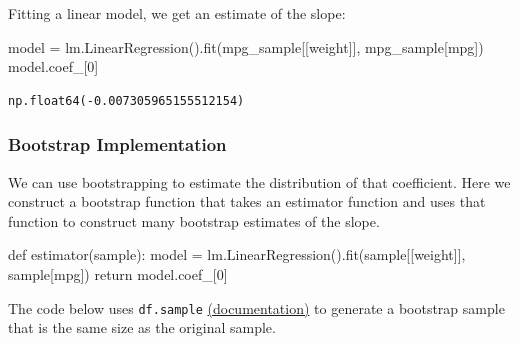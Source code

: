 \documentclass[
  letterpaper,
  DIV=11,
  numbers=noendperiod]{scrreprt}
\newenvironment{Shaded}{\begin{snugshade}}{\end{snugshade}}
\newcommand{\ControlFlowTok}[1]{\textcolor[rgb]{0.00,0.23,0.31}{#1}}
\newcommand{\DecValTok}[1]{\textcolor[rgb]{0.68,0.00,0.00}{#1}}
\newcommand{\KeywordTok}[1]{\textcolor[rgb]{0.00,0.23,0.31}{#1}}
\newcommand{\NormalTok}[1]{\textcolor[rgb]{0.00,0.23,0.31}{#1}}
\newcommand{\OperatorTok}[1]{\textcolor[rgb]{0.37,0.37,0.37}{#1}}
\newcommand{\StringTok}[1]{\textcolor[rgb]{0.13,0.47,0.30}{#1}}
\begin{document}
Fitting a linear model, we get an estimate of the slope:

\begin{Shaded}
\begin{Highlighting}[]
\NormalTok{model }\OperatorTok{=}\NormalTok{ lm.LinearRegression().fit(mpg\_sample[[}\StringTok{\textquotesingle{}weight\textquotesingle{}}\NormalTok{]], mpg\_sample[}\StringTok{\textquotesingle{}mpg\textquotesingle{}}\NormalTok{])}
\NormalTok{model.coef\_[}\DecValTok{0}\NormalTok{] }
\end{Highlighting}
\end{Shaded}

\begin{verbatim}
np.float64(-0.007305965155512154)
\end{verbatim}

\subsubsection{Bootstrap Implementation}\label{bootstrap-implementation}

We can use bootstrapping to estimate the distribution of that
coefficient. Here we construct a bootstrap function that takes an
estimator function and uses that function to construct many bootstrap
estimates of the slope.

\begin{Shaded}
\begin{Highlighting}[]
\KeywordTok{def}\NormalTok{ estimator(sample):}
\NormalTok{    model }\OperatorTok{=}\NormalTok{ lm.LinearRegression().fit(sample[[}\StringTok{\textquotesingle{}weight\textquotesingle{}}\NormalTok{]], sample[}\StringTok{\textquotesingle{}mpg\textquotesingle{}}\NormalTok{])}
    \ControlFlowTok{return}\NormalTok{ model.coef\_[}\DecValTok{0}\NormalTok{]}
\end{Highlighting}
\end{Shaded}

The code below uses \texttt{df.sample}
\href{https://pandas.pydata.org/pandas-docs/stable/reference/api/pandas.DataFrame.sample.html}{(documentation)}
to generate a bootstrap sample that is the same size as the original
sample.
\end{document}
